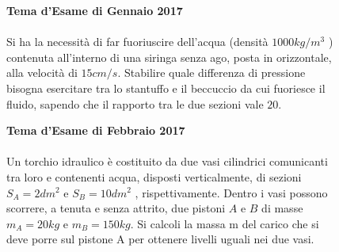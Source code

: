 \begin{figure}[h!]
    \textbf{Tema d'Esame di Gennaio 2017}\\ \\
    Si ha la necessità di far fuoriuscire dell'acqua (densità $1000 kg/m^3$
    ) contenuta all'interno di una siringa senza ago, posta in orizzontale, alla velocità di $15 cm/s$.
     Stabilire quale differenza di pressione bisogna esercitare tra lo stantuffo e il beccuccio da cui fuoriesce il
    fluido, sapendo che il rapporto tra le due sezioni vale $20$. 
\end{figure}

\begin{figure}[h!]
    \textbf{Tema d'Esame di Febbraio 2017}\\ \\
    Un torchio idraulico è costituito da due vasi cilindrici comunicanti tra loro e contenenti acqua, disposti verticalmente, di sezioni $S_A =2 dm^2$  e $S_B = 10 dm^2$ , rispettivamente. Dentro i vasi possono scorrere, a tenuta e senza attrito, due pistoni $A$ e $B$ di masse $m_A = 20 kg$ e $m_B = 150 kg$. Si calcoli la massa m del carico che si deve porre sul pistone A per ottenere livelli uguali nei due vasi.
\end{figure}